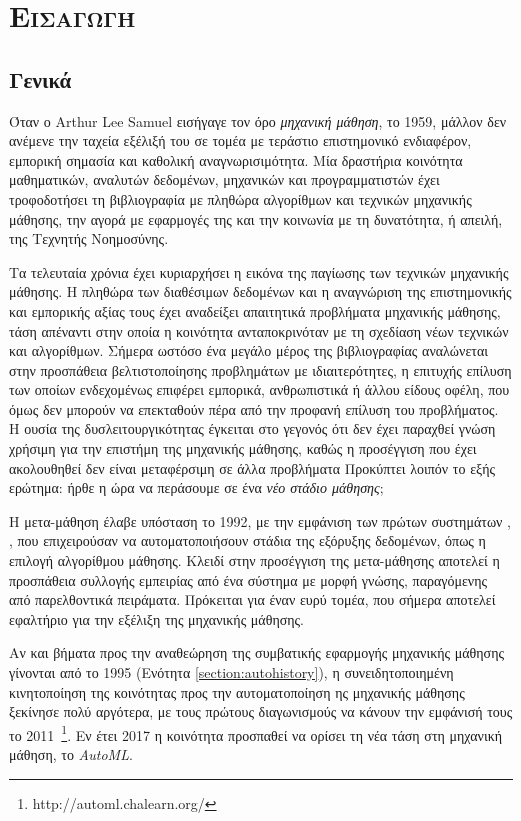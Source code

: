 \chapter{\scshape{Εισαγωγή}}
\section{Γενικά}
Όταν ο Arthur Lee Samuel εισήγαγε τον όρο \textit{μηχανική μάθηση}, το 1959, μάλλον δεν ανέμενε την ταχεία εξέλιξή του σε τομέα με τεράστιο επιστημονικό ενδιαφέρον, εμπορική σημασία και καθολική αναγνωρισιμότητα. Μία δραστήρια κοινότητα μαθηματικών, αναλυτών δεδομένων, μηχανικών και προγραμματιστών έχει τροφοδοτήσει τη βιβλιογραφία με πληθώρα αλγορίθμων και τεχνικών μηχανικής μάθησης, την αγορά με εφαρμογές της και την κοινωνία με τη δυνατότητα, ή απειλή, της Τεχνητής Νοημοσύνης.

Τα τελευταία χρόνια έχει κυριαρχήσει η εικόνα της παγίωσης των τεχνικών μηχανικής μάθησης. Η πληθώρα των διαθέσιμων δεδομένων και η αναγνώριση της επιστημονικής και εμπορικής αξίας τους έχει αναδείξει απαιτητικά προβλήματα μηχανικής μάθησης, τάση απέναντι στην οποία η κοινότητα ανταποκρινόταν με τη σχεδίαση νέων τεχνικών και αλγορίθμων. Σήμερα ωστόσο ένα μεγάλο μέρος της βιβλιογραφίας αναλώνεται στην προσπάθεια βελτιστοποίησης προβλημάτων με ιδιαιτερότητες, η επιτυχής επίλυση των οποίων ενδεχομένως επιφέρει εμπορικά, ανθρωπιστικά ή άλλου είδους οφέλη, που όμως δεν μπορούν να επεκταθούν πέρα από την προφανή επίλυση του προβλήματος. Η ουσία της δυσλειτουργικότητας έγκειται στο γεγονός ότι δεν έχει παραχθεί γνώση χρήσιμη για την επιστήμη της μηχανικής μάθησης, καθώς η προσέγγιση που έχει ακολουθηθεί δεν είναι μεταφέρσιμη σε άλλα προβλήματα Προκύπτει λοιπόν το εξής ερώτημα: ήρθε η ώρα να περάσουμε σε ένα \textit{νέο στάδιο μάθησης};

Η μετα-μάθηση έλαβε υπόσταση το 1992, με την εμφάνιση των πρώτων συστημάτων \citep{craw1993,Brazdil1994}, , που επιχειρούσαν να αυτοματοποιήσουν στάδια της εξόρυξης δεδομένων, όπως η επιλογή αλγορίθμου μάθησης. Κλειδί στην προσέγγιση της μετα-μάθησης αποτελεί η προσπάθεια συλλογής εμπειρίας από ένα σύστημα με μορφή γνώσης, παραγόμενης από παρελθοντικά πειράματα. Πρόκειται για έναν ευρύ τομέα, που σήμερα αποτελεί εφαλτήριο για την εξέλιξη της μηχανικής μάθησης.


Αν και βήματα προς την αναθεώρηση της συμβατικής εφαρμογής μηχανικής μάθησης γίνονται από το 1995 (Ενότητα \ref{section:autohistory}), η συνειδητοποιημένη κινητοποίηση της κοινότητας προς την αυτοματοποίηση ης μηχανικής μάθησης ξεκίνησε πολύ αργότερα, με τους πρώτους διαγωνισμούς να κάνουν την εμφάνισή τους το 2011~\footnote{http://automl.chalearn.org/}. Εν έτει 2017 η κοινότητα προσπαθεί να ορίσει τη νέα τάση στη μηχανική μάθηση, το \textit{AutoML}.

